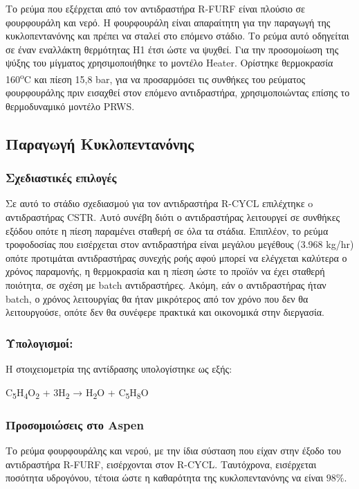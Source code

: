 \documentclass[11pt]{article}
\begin{document}
Το ρεύμα που εξέρχεται από τον αντιδραστήρα R-FURF είναι πλούσιο σε
φουρφουράλη και νερό. Η φουρφουράλη είναι απαραίτητη για την παραγωγή
της κυκλοπεντανόνης και πρέπει να σταλεί στο επόμενο στάδιο. Το ρεύμα
αυτό οδηγείται σε έναν εναλλάκτη θερμότητας Η1 έτσι ώστε να ψυχθεί. Για
την προσομοίωση της ψύξης του μίγματος χρησιμοποιήθηκε το μοντέλο
Heater. Ορίστηκε θερμοκρασία 160\textsuperscript{o}C και πίεση 15,8 bar, για να
προσαρμόσει τις συνθήκες του ρεύματος φουρφουράλης πριν εισαχθεί στον
επόμενο αντιδραστήρα, χρησιμοποιώντας επίσης το θερμοδυναμικό μοντέλο
PRWS.

\subsection{Παραγωγή Κυκλοπεντανόνης}
\label{sec:orgda9d537}
\subsubsection{Σχεδιαστικές επιλογές}
\label{sec:org9e18fac}
Σε αυτό το στάδιο σχεδιασμού για τον αντιδραστήρα R-CYCL επιλέχτηκε o
αντιδραστήρας CSTR. Αυτό συνέβη διότι ο αντιδραστήρας λειτουργεί σε
συνθήκες εξόδου οπότε η πίεση παραμένει σταθερή σε όλα τα στάδια.
Επιπλέον, το ρεύμα τροφοδοσίας που εισέρχεται στον αντιδραστήρα είναι
μεγάλου μεγέθους (3.968 kg/hr) οπότε προτιμάται αντιδραστήρας συνεχής
ροής αφού μπορεί να ελέγχεται καλύτερα ο χρόνος παραμονής, η θερμοκρασία
και η πίεση ώστε το προϊόν να έχει σταθερή ποιότητα, σε σχέση με batch
αντιδραστήρες. Ακόμη, εάν ο αντιδραστήρας ήταν batch, ο χρόνος
λειτουργίας θα ήταν μικρότερος από τον χρόνο που δεν θα λειτουργούσε,
οπότε δεν θα συνέφερε πρακτικά και οικονομικά στην διεργασία.

\subsubsection{Υπολογισμοί:}
\label{sec:orgf3687be}
Η στοιχειομετρία της αντίδρασης υπολογίστηκε ως εξής:

C\textsubscript{5}H\textsubscript{4}O\textsubscript{2} + 3H\textsubscript{2} → H\textsubscript{2}O + C\textsubscript{5}H\textsubscript{8}O

\subsubsection{Προσομοιώσεις στο Aspen}
\label{sec:org2fe79c3}
Το ρεύμα φουρφουράλης και νερού, με την ίδια σύσταση που είχαν στην
έξοδο του αντιδραστήρα R-FURF, εισέρχονται στον R-CYCL. Ταυτόχρονα,
εισέρχεται ποσότητα υδρογόνου, τέτοια ώστε η καθαρότητα της κυκλοπεντανόνης
να είναι \(98 \%\).
\end{document}
